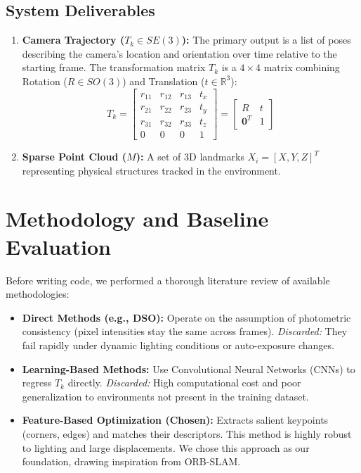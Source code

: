 \documentclass[12pt]{article}
\begin{document}
\subsection{System Deliverables}
\begin{enumerate}
    \item \textbf{Camera Trajectory ($T_k \in SE(3)$):} The primary output is a list of poses describing the camera's location and orientation over time relative to the starting frame. The transformation matrix $T_k$ is a $4 \times 4$ matrix combining Rotation ($R \in SO(3)$) and Translation ($t \in \mathbb{R}^3$):
    \begin{equation}
        T_k = \begin{bmatrix} 
        r_{11} & r_{12} & r_{13} & t_x \\
        r_{21} & r_{22} & r_{23} & t_y \\
        r_{31} & r_{32} & r_{33} & t_z \\
        0 & 0 & 0 & 1
        \end{bmatrix} = \begin{bmatrix} R & t \\ \mathbf{0}^T & 1 \end{bmatrix}
    \end{equation}
    
    \item \textbf{Sparse Point Cloud ($M$):} A set of 3D landmarks $X_i = [X, Y, Z]^T$ representing physical structures tracked in the environment.
\end{enumerate}

\section{Methodology and Baseline Evaluation}
Before writing code, we performed a thorough literature review of available methodologies:
\begin{itemize}
    \item \textbf{Direct Methods (e.g., DSO):} Operate on the assumption of photometric consistency (pixel intensities stay the same across frames). \textit{Discarded:} They fail rapidly under dynamic lighting conditions or auto-exposure changes.
    \item \textbf{Learning-Based Methods:} Use Convolutional Neural Networks (CNNs) to regress $T_k$ directly. \textit{Discarded:} High computational cost and poor generalization to environments not present in the training dataset.
    \item \textbf{Feature-Based Optimization (Chosen):} Extracts salient keypoints (corners, edges) and matches their descriptors. This method is highly robust to lighting and large displacements. We chose this approach as our foundation, drawing inspiration from ORB-SLAM.
\end{itemize}
\end{document}

